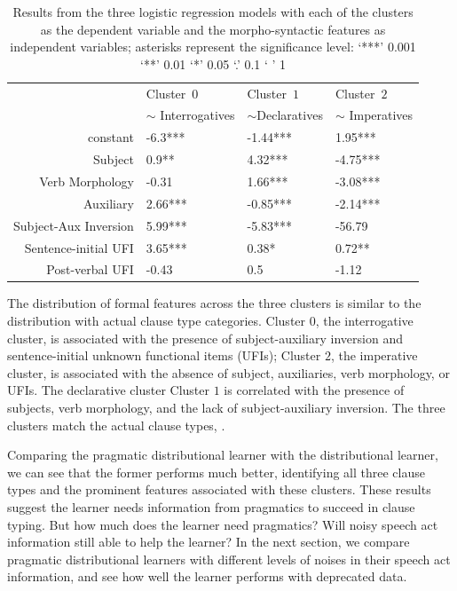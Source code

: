 \begin{table}[H]
\begin{center}
\begin{tabular}{r|l|l|l}
\hline
 & Cluster~$0$   & Cluster~$1$   &  Cluster~$2$ \\
 & $\sim$ Interrogatives  & $\sim$Declaratives  & $\sim$ Imperatives \\
 \hline\hline
constant & -6.3*** & -1.44*** & 1.95*** \\
\hline
Subject & 0.9** & 4.32*** & -4.75*** \\
\hline
Verb Morphology & -0.31 & 1.66***  & -3.08*** \\
\hline
Auxiliary & 2.66***  & -0.85*** & -2.14*** \\
\hline
Subject-Aux Inversion &5.99*** & -5.83*** & -56.79 \\
\hline
Sentence-initial UFI & 3.65*** & 0.38* & 0.72** \\
\hline
Post-verbal UFI & -0.43  & 0.5  & -1.12 \\
\hline \hline
\end{tabular}
\end{center}
\caption{Results from the three logistic regression models with each of the clusters as the dependent variable and the morpho-syntactic features as independent variables; asterisks represent the significance level: ‘***’ 0.001 ‘**’ 0.01 ‘*’ 0.05 ‘.’ 0.1 ‘ ’ 1}
\label{tab:target-synstats}
\end{table}%



The distribution of formal features across the three clusters is similar to the distribution with actual clause type categories. Cluster $0$, the interrogative cluster, is associated with the presence of subject-auxiliary inversion and sentence-initial unknown functional items (UFIs); Cluster $2$, the imperative cluster, is associated with the absence of subject, auxiliaries, verb morphology, or UFIs. The declarative cluster Cluster $1$ is correlated with the presence of subjects, verb morphology, and the lack of subject-auxiliary inversion. The three clusters match the actual clause types, \diis.

Comparing the pragmatic distributional learner with the distributional learner, we can see that the former performs much better, identifying all three clause types and the prominent features associated with these clusters. These results suggest the learner needs information from pragmatics to succeed in clause typing. But how much does the learner need pragmatics? Will noisy speech act information still able to help the learner? In the next section, we compare pragmatic distributional learners with different levels of noises in their speech act information, and see how well the learner performs with deprecated data.

